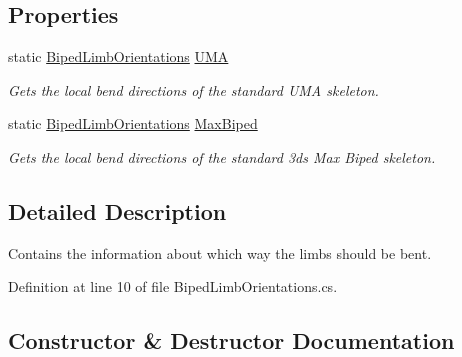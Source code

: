 \subsection*{Properties}
\begin{DoxyCompactItemize}
\item 
static \mbox{\hyperlink{class_root_motion_1_1_biped_limb_orientations}{Biped\+Limb\+Orientations}} \mbox{\hyperlink{class_root_motion_1_1_biped_limb_orientations_ada203c147babe620801e7fb7e7ddf534}{U\+MA}}
\begin{DoxyCompactList}\small\item\em Gets the local bend directions of the standard U\+MA skeleton. \end{DoxyCompactList}\item 
static \mbox{\hyperlink{class_root_motion_1_1_biped_limb_orientations}{Biped\+Limb\+Orientations}} \mbox{\hyperlink{class_root_motion_1_1_biped_limb_orientations_af5b7de0727f69656fe170e3852012ac8}{Max\+Biped}}
\begin{DoxyCompactList}\small\item\em Gets the local bend directions of the standard 3ds Max Biped skeleton. \end{DoxyCompactList}\end{DoxyCompactItemize}


\subsection{Detailed Description}
Contains the information about which way the limbs should be bent. 



Definition at line 10 of file Biped\+Limb\+Orientations.\+cs.



\subsection{Constructor \& Destructor Documentation}
\mbox{\label{class_root_motion_1_1_biped_limb_orientations_ab083dfcae050ea226d3694a442e064b9}} 
